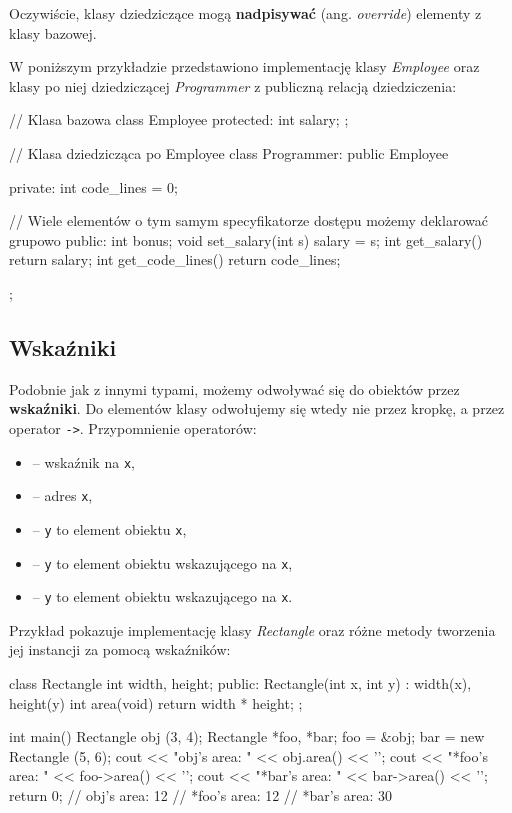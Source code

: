 Oczywiście, klasy dziedziczące mogą \textbf{nadpisywać} (ang. \textit{override}) elementy z klasy bazowej.

\begin{example}
    W poniższym przykładzie przedstawiono implementację klasy \textit{Employee} oraz klasy po niej dziedziczącej \textit{Programmer} z publiczną relacją dziedziczenia:
    \begin{cpp}
    // Klasa bazowa
    class Employee {
      protected:
        int salary;
    };
    
    // Klasa dziedzicząca po Employee
    class Programmer: public Employee {
    
      private:
        int code_lines = 0;

      // Wiele elementów o tym samym specyfikatorze dostępu możemy deklarować grupowo
      public:
        int bonus;
        void set_salary(int s) {
          salary = s;
        }
        int get_salary() {
          return salary;
        }
        int get_code_lines() {
            return code_lines;
        }
    };
    \end{cpp}
\end{example}

\subsection{Wskaźniki}
Podobnie jak z innymi typami, możemy odwoływać się do obiektów przez \textbf{wskaźniki}. Do elementów klasy odwołujemy się wtedy nie przez kropkę, a przez operator \texttt{->}.
Przypomnienie operatorów:
\begin{itemize}
    \item {} -- wskaźnik na \texttt{x},
    \item {} -- adres \texttt{x},
    \item {} -- \texttt{y} to element obiektu \texttt{x},
    \item {} -- \texttt{y} to element obiektu wskazującego na \texttt{x},
    \item {} -- \texttt{y} to element obiektu wskazującego na \texttt{x}.
\end{itemize}

\begin{example}
Przykład pokazuje implementację klasy \textit{Rectangle} oraz różne metody tworzenia jej instancji za pomocą wskaźników:
    \begin{cpp}
    class Rectangle {
      int width, height;
    public:
      Rectangle(int x, int y) : width(x), height(y) {}
      int area(void) { return width * height; }
    };
    
    int main() {
      Rectangle obj (3, 4);
      Rectangle *foo, *bar;
      foo = &obj;
      bar = new Rectangle (5, 6);
      cout << "obj's area: " << obj.area() << '\n';
      cout << "*foo's area: " << foo->area() << '\n';
      cout << "*bar's area: " << bar->area() << '\n';    
      return 0;
    }
    // obj's area: 12
    // *foo's area: 12
    // *bar's area: 30
    \end{cpp}
\end{example}

